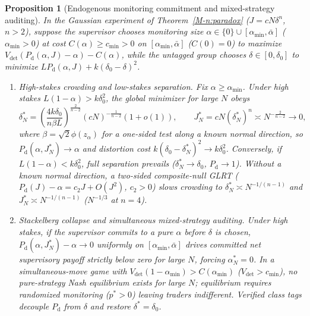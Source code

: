 \documentclass[12pt]{article}
\newtheorem{proposition}[theorem]{Proposition}
\theoremstyle{definition}
\theoremstyle{remark}
\begin{document}
\begin{proposition}[Endogenous monitoring commitment and mixed-strategy auditing]\label{prop:endogenous_supervisor}
In the Gaussian experiment of Theorem~\ref{M-n:paradox} ($J = c N \delta^n$, $n > 2$), suppose the supervisor chooses monitoring size $\alpha \in \{0\} \cup [\alpha_{\min}, \bar{\alpha}]$ ($\alpha_{\min} > 0$) at cost $C(\alpha) \ge c_{\min} > 0$ on $[\alpha_{\min}, \bar{\alpha}]$ ($C(0) = 0$) to maximize $V_{\mathrm{det}}(P_{\mathrm{d}}(\alpha, J) - \alpha) - C(\alpha)$, while the untagged group chooses $\delta \in [0, \delta_0]$ to minimize $L P_{\mathrm{d}}(\alpha, J) + k(\delta_0 - \delta)^2$.
\begin{enumerate}
  \item[(i)] \emph{High-stakes crowding and low-stakes separation.} Fix $\alpha \ge \alpha_{\min}$. Under high stakes $L(1 - \alpha) > k \delta_0^2$, the global minimizer for large $N$ obeys
  \[
    \delta_N^* = \left(\frac{4 k \delta_0}{n \beta L}\right)^{\frac{2}{n-2}} (c N)^{-\frac{1}{n-2}} (1 + o(1)), \qquad J_N^* = c N (\delta_N^*)^n \asymp N^{-\frac{2}{n-2}} \to 0,
  \]
  where $\beta = \sqrt{2}\phi(z_\alpha)$ for a one-sided test along a known normal direction, so $P_{\mathrm{d}}(\alpha, J_N^*) \to \alpha$ and distortion cost $k(\delta_0 - \delta_N^*)^2 \to k\delta_0^2$. Conversely, if $L(1 - \alpha) < k \delta_0^2$, full separation prevails ($\delta_N^* \to \delta_0$, $P_{\mathrm{d}} \to 1$). Without a known normal direction, a two-sided composite-null GLRT ($P_{\mathrm{d}}(J) - \alpha = c_2 J + O(J^2)$, $c_2 > 0$) slows crowding to $\delta_N^* \asymp N^{-1/(n-1)}$ and $J_N^* \asymp N^{-1/(n-1)}$ ($N^{-1/3}$ at $n=4$).
  \item[(ii)] \emph{Stackelberg collapse and simultaneous mixed-strategy auditing.} Under high stakes, if the supervisor commits to a pure $\alpha$ before $\delta$ is chosen, $P_{\mathrm{d}}(\alpha, J_N^*) - \alpha \to 0$ uniformly on $[\alpha_{\min}, \bar{\alpha}]$ drives committed net supervisory payoff strictly below zero for large $N$, forcing $\alpha_N^* = 0$. In a simultaneous-move game with $V_{\mathrm{det}}(1 - \alpha_{\min}) > C(\alpha_{\min})$ ($V_{\mathrm{det}} > c_{\min}$), no pure-strategy Nash equilibrium exists for large $N$; equilibrium requires randomized monitoring ($p^* > 0$) leaving traders indifferent. Verified class tags decouple $P_{\mathrm{d}}$ from $\delta$ and restore $\delta^* = \delta_0$.
\end{enumerate}
\end{proposition}
\end{document}
